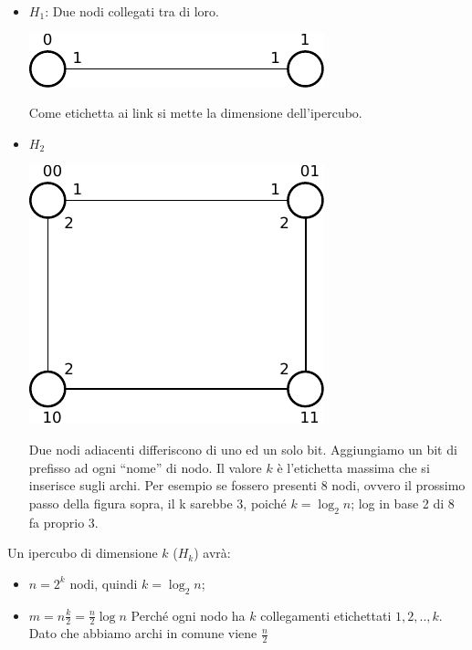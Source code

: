 \begin{itemize}
    \item $H_1$: Due nodi collegati tra di loro.
          \begin{center}
              \includegraphics[scale=0.8]{images/n_10}
          \end{center}
          Come etichetta ai link si mette la dimensione dell'ipercubo.

    \item $H_2$
          \begin{center}
              \includegraphics[scale=0.8]{images/n_11}
          \end{center}
          Due nodi adiacenti differiscono di uno ed un solo bit. Aggiungiamo un
          bit di prefisso ad ogni ``nome'' di nodo. Il valore $k$ è l'etichetta
          massima che si inserisce sugli archi. Per esempio se fossero presenti 8
          nodi, ovvero il prossimo passo della figura sopra, il k sarebbe 3,
          poiché $k = \log_2{n}$; log in base 2 di 8 fa proprio 3.
\end{itemize}

Un ipercubo di dimensione $k$ ($H_k$) avrà:
\begin{itemize}
    \item $n = 2^k$ nodi, quindi $k = \log_2{n}$;
    \item $m = n \frac{k}{2} = \frac{n}{2} \log n$ Perché ogni nodo ha $k$
          collegamenti etichettati $1,2,..,k$. Dato che abbiamo archi in comune viene
          $\frac{n}{2}$
\end{itemize}

